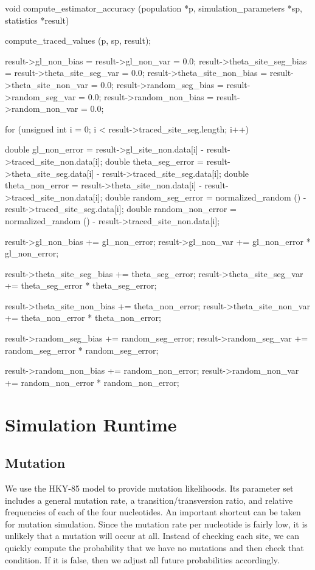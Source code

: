 \documentclass{article}
\begin{document}
\begin{ccode}
void compute_estimator_accuracy (population *p, simulation_parameters *sp, statistics *result) {
  compute_traced_values (p, sp, result);

  result->gl_non_bias		= result->gl_non_var		= 0.0;
  result->theta_site_seg_bias	= result->theta_site_seg_var	= 0.0;
  result->theta_site_non_bias	= result->theta_site_non_var	= 0.0;
  result->random_seg_bias	= result->random_seg_var	= 0.0;
  result->random_non_bias	= result->random_non_var	= 0.0;

  for (unsigned int i = 0; i < result->traced_site_seg.length; i++) {
    double gl_non_error		= result->gl_site_non.data[i] - result->traced_site_non.data[i];
    double theta_seg_error	= result->theta_site_seg.data[i] - result->traced_site_seg.data[i];
    double theta_non_error	= result->theta_site_non.data[i] - result->traced_site_non.data[i];
    double random_seg_error	= normalized_random () - result->traced_site_seg.data[i];
    double random_non_error	= normalized_random () - result->traced_site_non.data[i];

    result->gl_non_bias		+= gl_non_error;
    result->gl_non_var		+= gl_non_error * gl_non_error;

    result->theta_site_seg_bias += theta_seg_error;
    result->theta_site_seg_var	+= theta_seg_error * theta_seg_error;

    result->theta_site_non_bias	+= theta_non_error;
    result->theta_site_non_var	+= theta_non_error * theta_non_error;

    result->random_seg_bias	+= random_seg_error;
    result->random_seg_var	+= random_seg_error * random_seg_error;

    result->random_non_bias	+= random_non_error;
    result->random_non_var	+= random_non_error * random_non_error;
  }
}
\end{ccode}

  \section{Simulation Runtime}


    
    \subsection{Mutation}
    
      We use the HKY-85 model to provide mutation likelihoods. Its parameter set
      includes a general mutation rate, a transition/transversion ratio, and
      relative frequencies of each of the four nucleotides. An important
      shortcut can be taken for mutation simulation. Since the mutation rate per
      nucleotide is fairly low, it is unlikely that a mutation will occur at
      all. Instead of checking each site, we can quickly compute the probability
      that we have no mutations and then check that condition. If it is false,
      then we adjust all future probabilities accordingly.
\end{document}
